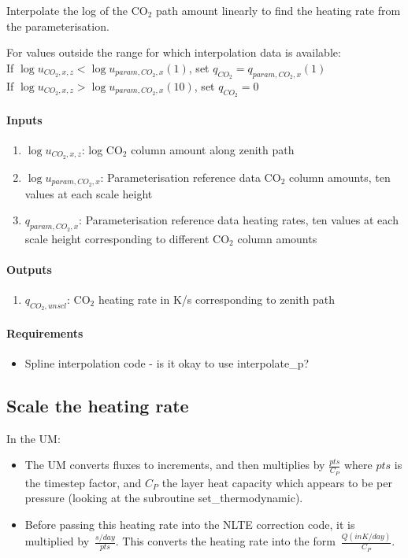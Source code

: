    Interpolate the log of the CO$_2$ path amount linearly to find the heating 
   rate from the parameterisation.

   For values outside the range for which interpolation data is available: \\
   If $\log u_{CO_2, x, z} < \log u_{param, CO_2, x}(1)$, set $q_{CO_2} = q_{param, CO_2, x}(1)$ \\
   If $\log u_{CO_2, x, z} > \log u_{param, CO_2, x}(10)$, set $q_{CO_2} = 0$ \\

   \paragraph{Inputs}
   \begin{enumerate}
   \item $\log u_{CO_2, x, z}$: log CO$_2$ column amount along zenith path
   \item $\log u_{param, CO_2, x}$: Parameterisation reference data CO$_2$ column 
     amounts, ten values at each scale height
   \item $q_{param, CO_2, x}$: Parameterisation reference data heating rates, 
     ten values at each scale height corresponding to different CO$_2$ column 
     amounts
   \end{enumerate}

   \paragraph{Outputs}
   \begin{enumerate}
   \item $q_{CO_2, unscl}$: CO$_2$ heating rate in K/s corresponding to zenith path
   \end{enumerate}

   \paragraph{Requirements}
   \begin{itemize}   
   \item Spline interpolation code - is it okay to use interpolate\_p?
   \end{itemize}

\subsection{Scale the heating rate}

   In the UM:
   \begin{itemize}
   \item The UM converts fluxes to increments, and then multiplies
     by $\frac{pts}{C_P}$ where $pts$ is the timestep factor, and 
     $C_P$ the layer heat capacity which appears to be per pressure 
     (looking at the subroutine set\_thermodynamic).
   \item Before passing this heating rate into the NLTE correction 
     code, it is multiplied by~$\frac{s/day}{pts}$. This 
     converts the heating rate into the form~$\frac{Q(in K/day)}{C_P}$.
   \end{itemize}

